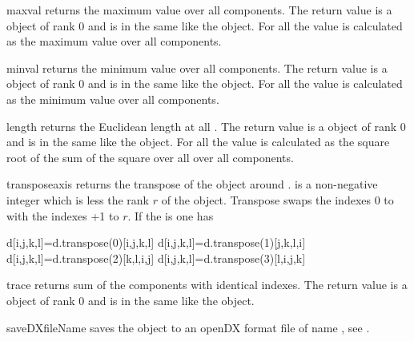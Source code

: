 \begin{methoddesc}[Data]{maxval}{}
returns the maximum value over all components. The
return value is a \Data object of rank 0 
and is in the same
\FunctionSpace like the object. For all \DataSamplePoints
the value is calculated as the maximum value over all components. 
\end{methoddesc}

\begin{methoddesc}[Data]{minval}{}
returns the minimum value over all components. The
return value is a \Data object of rank 0 
and is in the same
\FunctionSpace like the object. For all \DataSamplePoints
the value is calculated as the minimum value over all components. 
\end{methoddesc}

\begin{methoddesc}[Data]{length}{}
returns the Euclidean length at all \DataSamplePoints. The
return value is a \Data object of rank 0 
and is in the same
\FunctionSpace like the object. For all \DataSamplePoints
the value is calculated as the square root of the sum of the square over all over all components. 
\end{methoddesc}
\begin{methoddesc}[Data]{transpose}{axis}
returns the transpose of the object around .  is a non-negative integer
which is less the rank $r$ of the object. Transpose swaps the indexes $0$ to 
with the indexes +1 to $r$. If the  is \RankFour one has 
\begin{python}
d[i,j,k,l]=d.transpose(0)[i,j,k,l]
d[i,j,k,l]=d.transpose(1)[j,k,l,i]
d[i,j,k,l]=d.transpose(2)[k,l,i,j]
d[i,j,k,l]=d.transpose(3)[l,i,j,k]
\end{python}
\end{methoddesc}

\begin{methoddesc}[Data]{trace}{}
returns sum of the components with identical indexes. 
The
return value is a \Data object of rank 0 
and is in the same
\FunctionSpace like the object.
\end{methoddesc}
\begin{methoddesc}[Data]{saveDX}{fileName}
saves the object to an openDX format file of name , see
.  
\end{methoddesc}


